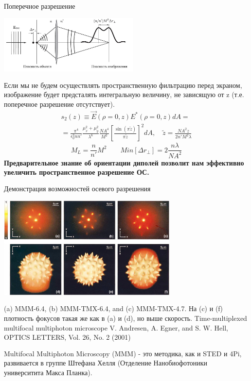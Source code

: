 \documentclass[9pt, compress, xcolor=table]{beamer}
\begin{document}
\begin{frame}{Поперечное разрешение}
\begin{center}
\includegraphics[width=7cm]{fig4_05}
\end{center}
{\small Если мы не будем осуществлять пространственную фильтрацию перед экраном, изображение будет предсталять интегральную величину, не зависящую от z (т.е. поперечное разрешение отсутствует).}
\begin{multline*}
s_2(z) \equiv \vec E(\rho = 0, z) E^{*}(\rho = 0, z) dA =\\=
\frac{\pi^4}{\epsilon_0^2 n n'} \frac{\mu_x^2 + \mu_y^2}{\lambda^6}
\frac{NA^4}{M^2}\left[\frac{\sin (\pi \tilde{z})}{\pi \tilde{z}}\right]^2 dA, \quad \tilde{z} =
\frac{NA^2 z}{2n'M^2 \lambda}
\end{multline*}
\begin{equation*}\boxed{
M_L = \frac{n}{n'} M^2\qquad Min[\Delta r_{\perp}] = 2\frac{n \lambda}{NA^2}}
\end{equation*}
{\small \textbf{Предварительное знание об ориентации диполей позволит нам эффективно увеличить пространственное разрешение ОС.}}
\end{frame}

\begin{frame}{Демонстрация возможностей осевого разрешения}

\begin{center}
\includegraphics[width=9cm]{fig4_06}
\end{center}

{\small (a) MMM-6.4, (b) MMM-TMX-6.4, and (c) MMM-TMX-4.7. На (c) и (f) плотность фокусов такая же как в (a) и (d), но выше скорость. Time-multiplexed multifocal multiphoton microscope V. Andresen, A. Egner, and S. W. Hell, OPTICS LETTERS, Vol. 26, No. 2 (2001)}

Multifocal Multiphoton Microscopy (MMM) - это методика, как и STED и 4Pi, развивается в группе Штефана Хелля (Отделение Нанобиофотоники университита Макса Планка).

\end{frame}
\end{document}
